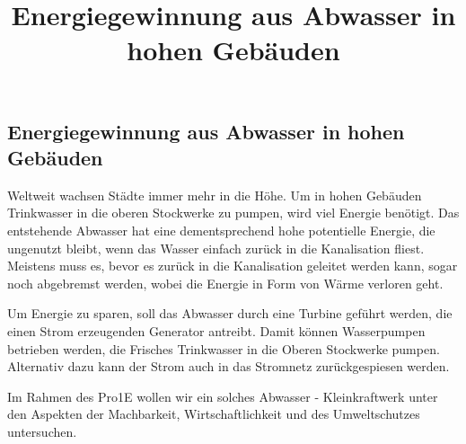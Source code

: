 \documentclass[12pt]{article}
\title{Energiegewinnung aus Abwasser in hohen Gebäuden}
\begin{document}
\subsection*{Energiegewinnung aus Abwasser in hohen Gebäuden}

Weltweit wachsen Städte immer mehr in die Höhe. Um in hohen Gebäuden Trinkwasser in die oberen Stockwerke zu pumpen, wird viel Energie benötigt. Das entstehende Abwasser hat eine dementsprechend hohe potentielle Energie, die ungenutzt bleibt, wenn das Wasser einfach zurück in die Kanalisation fliest. Meistens muss es, bevor es zurück in die Kanalisation geleitet werden kann, sogar noch abgebremst werden, wobei die Energie in Form von Wärme verloren geht. 

Um Energie zu sparen, soll das Abwasser durch eine Turbine geführt werden, die einen Strom erzeugenden Generator antreibt. Damit können Wasserpumpen betrieben werden, die Frisches Trinkwasser in die Oberen Stockwerke pumpen. Alternativ dazu kann der Strom auch in das Stromnetz zurückgespiesen werden. 

Im Rahmen des Pro1E wollen wir ein solches Abwasser - Kleinkraftwerk unter den Aspekten der Machbarkeit, Wirtschaftlichkeit und des Umweltschutzes untersuchen.  
\end{document}
